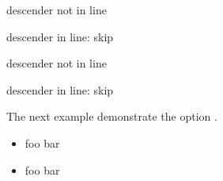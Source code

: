 \documentclass[openany,12pt,tocdepth=3]{ltx-md}
\begin{document}
\begin{center}
\captionsetup{format=plain}
\noindent\begin{minipage}[t]{0.5\linewidth}
\begin{ltxexample}[caption={Example\newline \Opt{ignore-last-descender}\Opt{=true}},result=true,xframed={margin=5pt}]
\begin{xframed}
  descender not in line
\end{xframed}
\begin{xframed}
  descender in line: skip
\end{xframed}
\end{ltxexample}
\end{minipage}%
\begin{minipage}[t]{0.5\linewidth}
\begin{ltxexample}[caption={Example \newline\Opt{ignore-last-descender}\Opt{=false}},result=true,xframed={margin=5pt}]
\begin{xframed}
  descender not in line
\end{xframed}
\begin{xframed}
  descender in line: skip
\end{xframed}
\end{ltxexample}
\end{minipage}
\end{center}

The next example demonstrate the option .
\begin{center}
\captionsetup{format=plain}
\noindent\begin{minipage}[t]{0.5\linewidth}
\begin{ltxexample}[caption={Example\newline \Opt{ignore-last-skip}\Opt{=true}},result=true,xframed={margin=5pt}]
\begin{xframed}
  \begin{itemize}
   \item foo bar
 \end{itemize}
\end{xframed}
\end{ltxexample}
\end{minipage}%
\begin{minipage}[t]{0.5\linewidth}
\begin{ltxexample}[caption={Example \newline\Opt{ignore-last-skip}\Opt{=false}},result=true,xframed={margin=5pt}]
\begin{xframed}
  \begin{itemize}
   \item foo bar
 \end{itemize}
\end{xframed}
\end{ltxexample}
\end{minipage}
\end{center}
\end{document}

